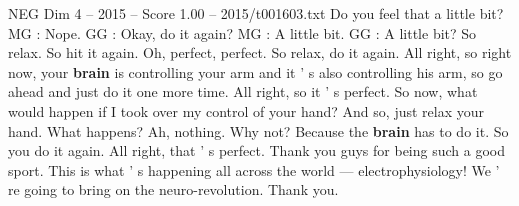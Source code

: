 \begin{textsample}{NEG Dim 4 – 2015 – Score 1.00 – 2015/t001603.txt}
Do you feel that a little bit?
MG : Nope.
GG : Okay, do it again?
MG : A little bit.
GG : A little bit?
So relax.
So hit it again.
Oh, perfect, perfect.
So relax, do it again.
All right, so right now, your \textbf{brain} is controlling your arm and it ' s also controlling his arm, so go ahead and just do it one more time.
All right, so it ' s perfect.
So now, what would happen if I took over my control of your hand?
And so, just relax your hand.
What happens?
Ah, nothing.
Why not?
Because the \textbf{brain} has to do it.
So you do it again.
All right, that ' s perfect.
Thank you guys for being such a good sport.
This is what ' s happening all across the world — electrophysiology!
We ' re going to bring on the neuro-revolution.
Thank you.

\end{textsample}
